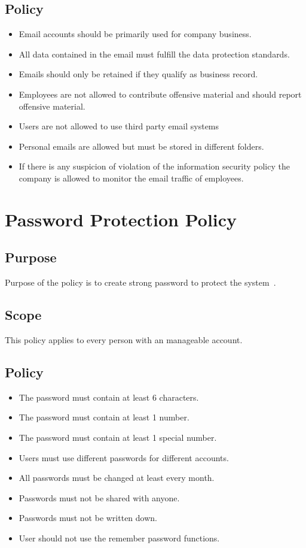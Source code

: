 \section{Policy}
\begin{itemize}
\item Email accounts should be primarily used for company business. 
\item All data contained in the email must fulfill the data protection standards.
\item Emails should only be retained if they qualify as business record.
\item Employees are not allowed to contribute offensive material and should report offensive material.
\item Users are not allowed to use third party email systems
\item Personal emails are allowed but must be stored in different folders.
\item If there is any suspicion of violation of the information security policy the company is allowed to monitor the email traffic of employees.  
\end{itemize}
\chapter{Password Protection Policy}
\section{Purpose}
Purpose of the policy is to create strong password to protect the system~\cite{Sans}. 
\section{Scope}
This policy applies to every person with an manageable account.
\section{Policy}
\begin{itemize}
\item The password must contain at least 6 characters. 
\item The password must contain at least 1 number.
\item The password must contain at least 1 special number.
\item Users must use different passwords for different accounts.
\item All passwords must be changed at least every month.
\item Passwords must not be shared with anyone.
\item Passwords must not be written down.
\item User should not use the remember password functions.
\end{itemize}
